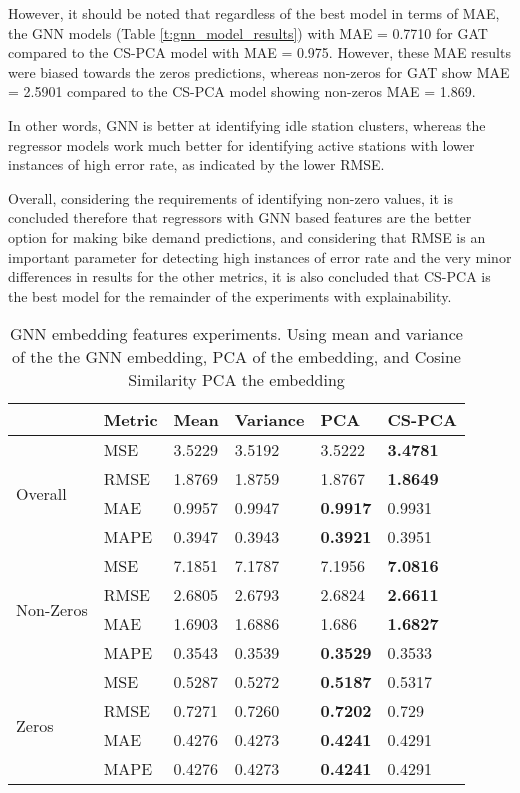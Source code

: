 \documentclass{article}
\begin{document}
However, it should be noted that regardless of the best model in terms of MAE, the GNN models (Table \ref{t:gnn_model_results}) with MAE = 0.7710 for GAT compared to the CS-PCA model with MAE = 0.975. However, these MAE results were biased towards the zeros predictions, whereas non-zeros for GAT show MAE = 2.5901 compared to the CS-PCA model showing non-zeros MAE = 1.869.

In other words, GNN is better at identifying idle station clusters, whereas the regressor models work much better for identifying active stations with lower instances of high error rate, as indicated by the lower RMSE.

Overall, considering the requirements of identifying non-zero values, it is concluded therefore that regressors with GNN based features are the better option for making bike demand predictions, and considering that RMSE is an important parameter for detecting high instances of error rate and the very minor differences in results for the other metrics, it is also concluded that CS-PCA is the best model for the remainder of the experiments with explainability.

\begin{table}[]
\begin{tabular}{||l|l|l|l|l|l||}
\hline
& Metric & Mean & Variance & PCA & CS-PCA \\ \hline
\multirow{4}{*}{Overall} 
& MSE    & 3.5229 & 3.5192 & 3.5222 & \textbf{3.4781} \\ \cline{2-6} 
& RMSE   & 1.8769 & 1.8759 & 1.8767 & \textbf{1.8649} \\ \cline{2-6} 
& MAE    & 0.9957 & 0.9947 & \textbf{0.9917} & 0.9931 \\ \cline{2-6} 
& MAPE   & 0.3947 & 0.3943 & \textbf{0.3921} & 0.3951 \\ \hline \hline
\multirow{4}{*}{Non-Zeros} 
& MSE    & 7.1851 & 7.1787 & 7.1956 & \textbf{7.0816} \\ \cline{2-6} 
& RMSE   & 2.6805 & 2.6793 & 2.6824 & \textbf{2.6611} \\ \cline{2-6} 
& MAE    & 1.6903 & 1.6886 & 1.686  & \textbf{1.6827} \\ \cline{2-6} 
& MAPE   & 0.3543 & 0.3539 & \textbf{0.3529} & 0.3533 \\ \hline\hline
\multirow{4}{*}{Zeros}     
& MSE    & 0.5287 & 0.5272 & \textbf{0.5187} & 0.5317 \\ \cline{2-6} 
& RMSE   & 0.7271 & 0.7260 & \textbf{0.7202} & 0.729  \\ \cline{2-6} 
& MAE    & 0.4276 & 0.4273 & \textbf{0.4241} & 0.4291 \\ \cline{2-6} 
& MAPE   & 0.4276 & 0.4273 & \textbf{0.4241} & 0.4291 \\ \hline
\end{tabular}
\caption{GNN embedding features experiments. Using mean and variance of the the GNN embedding, PCA of the embedding, and Cosine Similarity PCA the embedding}
\label{t:embedding_model_features}
\end{table}
\end{document}
